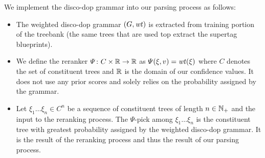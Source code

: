 \documentclass[../../document.tex]{subfiles}
\begin{document}
    We implement the disco-dop grammar into our parsing process as follows:
    \begin{itemize}
        \item The weighted disco-dop grammar \((G,\mathit{wt})\) is extracted from training portion of the treebank (the same trees that are used top extract the supertag blueprints).
        \item We define the reranker \(\varPsi\colon C \times \mathbb{R} \to \mathbb{R}\) as \(\varPsi(\xi, v) = \mathit{wt}(\xi)\) where \(C\) denotes the set of constituent trees and \(\mathbb{R}\) is the domain of our confidence values. It does not use any prior scores and solely relies on the probability assigned by the grammar.
        \item Let \(\xi_1 \ldots \xi_n \in C^n\) be a sequence of constituent trees of length \(n\in \mathbb{N}_+\) and the input to the reranking process.
        The \(\varPsi\)-pick among \(\xi_1 \ldots \xi_n\) is the constituent tree with greatest probability assigned by the weighted disco-dop grammar.
        It is the result of the reranking process and thus the result of our parsing process.
    \end{itemize}
\end{document}
